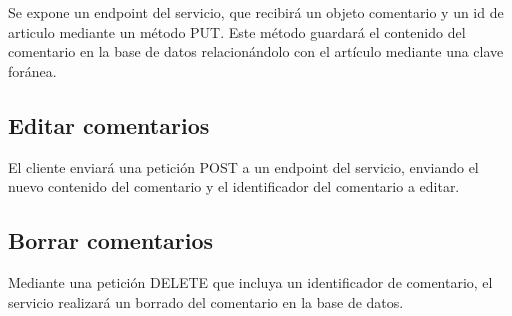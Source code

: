 Se expone un endpoint del servicio, que recibirá un objeto comentario y un id de articulo mediante un método PUT. Este método guardará el contenido del comentario en la base de datos relacionándolo con el artículo mediante una clave foránea.

\subsection{Editar comentarios}

El cliente enviará una petición POST a un endpoint del servicio, enviando el nuevo contenido del comentario y el identificador del comentario a editar.

\subsection{Borrar comentarios}

Mediante una petición DELETE que incluya un identificador de comentario, el servicio realizará un borrado del comentario en la base de datos.
